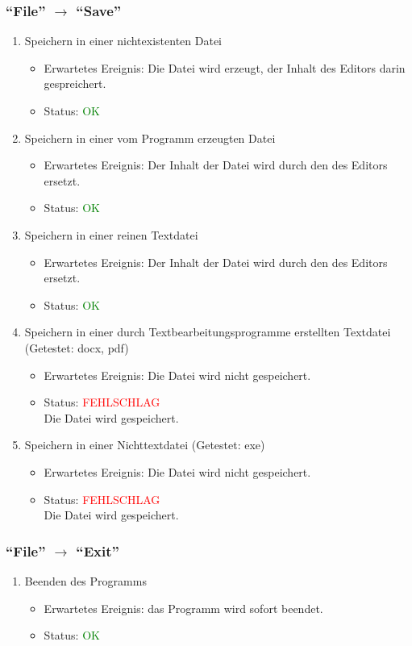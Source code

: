 \subsubsection{"`File"' $\rightarrow$ "`Save"'}
\begin{enumerate}
\item Speichern in einer nichtexistenten Datei
\begin{itemize}
\item Erwartetes Ereignis: Die Datei wird erzeugt, der Inhalt des Editors darin gespreichert. 
\item Status: \textcolor{green}{OK} 
\end{itemize}
\item Speichern in einer vom Programm erzeugten Datei
\begin{itemize}
\item Erwartetes Ereignis: Der Inhalt der Datei wird durch den des Editors ersetzt. 
\item Status: \textcolor{green}{OK} 
\end{itemize}
\item Speichern in einer reinen Textdatei
\begin{itemize}
\item Erwartetes Ereignis: Der Inhalt der Datei wird durch den des Editors ersetzt. 
\item Status: \textcolor{green}{OK} 
\end{itemize}
\item Speichern in einer durch Textbearbeitungsprogramme erstellten Textdatei (Getestet: docx, pdf)
\begin{itemize}
\item Erwartetes Ereignis: Die Datei wird nicht gespeichert. 
\item Status: \textcolor{red}{FEHLSCHLAG} \\
Die Datei wird gespeichert.
\end{itemize}
\item Speichern in einer Nichttextdatei (Getestet: exe)
\begin{itemize}
\item Erwartetes Ereignis: Die Datei wird nicht gespeichert. 
\item Status: \textcolor{red}{FEHLSCHLAG} \\
Die Datei wird gespeichert.
\end{itemize}
\end{enumerate}
\subsubsection{"`File"' $\rightarrow$ "`Exit"'}
\begin{enumerate}
\item Beenden des Programms
\begin{itemize}
\item Erwartetes Ereignis: das Programm wird sofort beendet. 
\item Status: \textcolor{green}{OK}
\end{itemize}
\end{enumerate}
